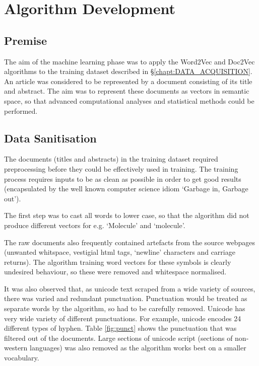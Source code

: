 \chapter{Algorithm Development}
\label{chapt:ALGORITHM}
\section{Premise}
The aim of the machine learning phase was to apply the Word2Vec and Doc2Vec algorithms to the training dataset described in \S\ref{chapt:DATA_ACQUISITION}. An article was considered to be represented by a document consisting of its title and abstract. The aim was to represent these documents as vectors in semantic space, so that advanced computational analyses and statistical methods could be performed. 
\section{Data Sanitisation} 
The documents (titles and abstracts) in the training dataset required preprocessing before they could be effectively used in training. The training process requires inputs to be as clean as possible in order to get good results (encapsulated by the well known computer science idiom `Garbage in, Garbage out'). 

The first step was to cast all words to lower case, so that the algorithm did not produce different vectors for e.g.  `Molecule' and `molecule'.

The raw documents also frequently contained artefacts from the source webpages (unwanted whitspace, vestigial html tags, `newline' characters and carriage returns). The algorithm training word vectors for these symbols is clearly undesired behaviour, so these were removed and whitespace normalised.

It was also observed that, as unicode text scraped from a wide variety of sources, there was varied and redundant punctuation. Punctuation would be treated as separate words by the algorithm, so had to be carefully removed. Unicode has very wide variety of different punctuations. For example, unicode encodes 24 different types of hyphen. Table \ref{fig:punct} shows the punctuation that was filtered out of the documents. Large sections of unicode script (sections of non-western languages) was also removed as the algorithm works best on a smaller vocabulary.

